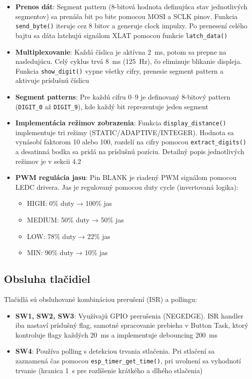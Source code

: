 \documentclass[a4paper, 11pt]{article}
\begin{document}
\begin{itemize}
    \item \textbf{Prenos dát}: Segment pattern (8-bitová hodnota definujúca stav jednotlivých segmentov) sa prenáša bit po bite pomocou MOSI a SCLK pinov. Funkcia \texttt{send\_byte()} iteruje cez 8 bitov a generuje clock impulzy. Po prenesení celého bajtu sa dáta latchujú signálom XLAT pomocou funkcie \texttt{latch\_data()}
    
    \item \textbf{Multiplexovanie}: Každá číslica je aktívna 2~ms, potom sa prepne na nasledujúcu. Celý cyklus trvá 8~ms (125~Hz), čo eliminuje blikanie displeja. Funkcia \texttt{show\_digit()} vypne všetky cifry, prenesie segment pattern a aktivuje príslušnú číslicu
    
    \item \textbf{Segment patterns}: Pre každú cifru 0--9 je definovaný 8-bitový pattern (\texttt{DIGIT\_0} až \texttt{DIGIT\_9}), kde každý bit reprezentuje jeden segment
    
    \item \textbf{Implementácia režimov zobrazenia}: Funkcia \texttt{display\_distance()} implementuje tri režimy (STATIC/ADAPTIVE/INTEGER). Hodnota sa vynásobí faktorom 10 alebo 100, rozdelí na cifry pomocou \texttt{extract\_digits()} a desatinná bodka sa pridá na príslušnú pozíciu. Detailný popis jednotlivých režimov je v sekcii 4.2
    
    \item \textbf{PWM regulácia jasu}: Pin BLANK je riadený PWM signálom pomocou LEDC drivera. Jas je regulovaný pomocou duty cycle (invertovaná logika):
    \begin{itemize}
        \item HIGH: 0\% duty → 100\% jas
        \item MEDIUM: 50\% duty → 50\% jas
        \item LOW: 78\% duty → 22\% jas
        \item MIN: 90\% duty → 10\% jas
    \end{itemize}
\end{itemize}
\subsection{Obsluha tlačidiel}
Tlačidlá sú obsluhované kombináciou prerušení (ISR) a pollingu:

\begin{itemize}
    \item \textbf{SW1, SW2, SW3}: Využívajú GPIO prerušenia (NEGEDGE). ISR handler iba nastaví príslušný flag, samotné spracovanie prebieha v Button Task, ktorý kontroluje flagy každých 20~ms a implementuje debouncing 200~ms
    
    \item \textbf{SW4}: Používa polling s detekciou trvania stlačenia. Pri stlačení sa zaznamená čas pomocou \texttt{esp\_timer\_get\_time()}, pri uvolnení sa vyhodnotí trvanie (hranica 1~s pre rozlíšenie krátkého a dlhého stlačenia)
\end{itemize}
\end{document}
